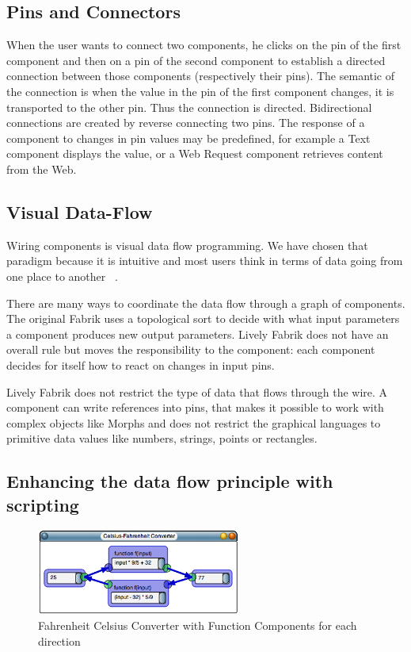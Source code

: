 \documentclass[pdftex, times, 10pt, twocolumn]{article}
\begin{document}
\subsection{Pins and Connectors}
When the user wants to connect two components, he clicks on the pin of the first component and then on a pin of the second component to establish a directed connection between those components (respectively their pins). The semantic of the connection is when the value in the pin of the first component changes, it is transported to the other pin. Thus the connection is directed. Bidirectional connections are created by reverse connecting two pins. The response of a component to changes in pin values may be predefined, for example a Text component displays the value, or a Web Request component retrieves content from the Web. 



\subsection{Visual Data-Flow}
Wiring components is visual data flow programming. We have chosen that paradigm because it is intuitive and most users think in terms of data going from one place to another ~\cite{Baroth1995VPR,Johnston2004ADP}. 

There are many ways to coordinate the data flow through a graph of components. The original Fabrik uses a topological sort to decide with what input parameters a component produces new output parameters. Lively Fabrik does not have an overall rule but moves the responsibility to the component: each component decides for itself how to react on changes in input pins.   

Lively Fabrik does not restrict the type of data that flows through the wire. A component can write references into pins, that makes it possible to work with complex objects like Morphs and does not restrict the graphical languages to primitive data values like numbers, strings, points or rectangles.  



\subsection{Enhancing the data flow principle with scripting}


\begin{figure}[]\centering
\includegraphics[width=0.600000\textwidth]{FabrikCelsiusFahrenheit.png} 

\caption{Fahrenheit Celsius Converter with Function Components for each direction }
\label{fig:FabrikCelsiusFahrenheit}
\end{figure}
\end{document}
